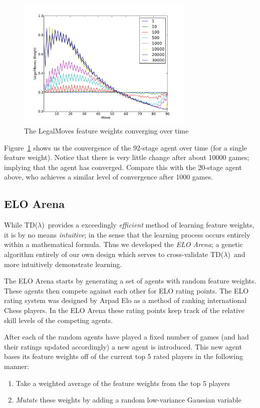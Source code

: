 \documentclass[11pt]{article}
\newcommand{\tdl}{TD($\lambda$)}
\begin{document}
\begin{figure}[H]
  \centering
  \includegraphics[trim=0cm 0cm 1.5cm 1cm, clip, width=0.75\textwidth]
    {../Graphs/legalmovesprogression.pdf}
  \caption{The LegalMoves feature weights converging over time}
  \label{LegalMovesConvergence}
\end{figure}

Figure~\ref{LegalMovesConvergence} shows us the convergence of the 92-stage agent
over time (for a single feature weight). Notice that there is very little
change after about 10000 games; implying that the agent has converged. Compare this
with the 20-stage agent above, who achieves a similar level of convergence after 1000
games.


\subsection{ELO Arena}
\label{sub:elo_arena}

While \tdl\ provides a exceedingly \emph{efficient} method of learning feature weights,
it is by no means \emph{intuitive}; in the sense that the learning process occurs
entirely within a mathematical formula. Thus we developed the \emph{ELO Arena};
a genetic algorithm entirely of our own design which serves to cross-validate
\tdl\ and more intuitively demonstrate learning.

The ELO Arena starts by generating a set of agents with random feature weights.
These agents then compete against each other for ELO rating points. The ELO rating
system was designed by Arpad Elo as a method of ranking international Chess players.
In the ELO Arena these rating points keep track of the relative skill levels of the competing
agents.

After each of the random agents have played a fixed number of games (and had their
ratings updated accordingly) a new agent is introduced. This new agent bases its feature
weights off of the current top 5 rated players in the following manner:
\begin{enumerate}
\item Take a weighted average of the feature weights from the top 5 players
\item \emph{Mutate} these weights by adding a random low-variance Gaussian variable
\end{enumerate}
\end{document}
